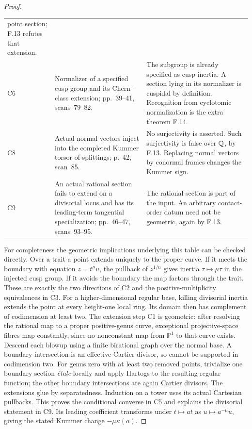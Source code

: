 \begin{proof}
\begin{longtable}{@{}>{\raggedright\arraybackslash}p{}>{\raggedright\arraybackslash}p{}>{\raggedright\arraybackslash}p{}@{}}
point section; F.13 refutes that extension.\\
C6 & Normalizer of a specified cusp group and its Chern-class
extension; pp.~39--41, scans~79--82.
& The subgroup is already specified as cusp inertia. A section
lying in its normalizer is cuspidal by definition. Recognition
from cyclotomic normalization is the extra theorem F.14.\\
C8 & Actual normal vectors inject into the completed Kummer
torsor of splittings; p.~42, scan~85.
& No surjectivity is asserted. Such surjectivity is false over
$\mathbb Q$, by F.13. Replacing normal vectors by conormal frames
changes the Kummer sign.\\
C9 & An actual rational section fails to extend on a divisorial
locus and has its leading-term tangential specialization;
pp.~46--47, scans~93--95.
& The rational section is part of the input. An arbitrary
contact-order datum need not be geometric, again by F.13.\\
\bottomrule
\end{longtable}

For completeness the geometric implications underlying this table
can be checked directly. Over a trait a point extends uniquely to
the proper curve. If it meets the boundary with equation
$z=t^\mu u$, the pullback of $z^{1/n}$ gives inertia
$\tau\mapsto\mu\tau$ in the injected cusp group. If it avoids
the boundary the map factors through the trait. These are exactly
the two directions of C2 and the positive-multiplicity equivalences
in C3. For a higher-dimensional regular base, killing divisorial
inertia extends the point at every height-one local ring. Its domain
then has complement of codimension at least two. The extension
step C1 is geometric: after resolving the rational map to a proper
positive-genus curve, exceptional projective-space fibres map
constantly, since no nonconstant map from $\mathbb P^1$ to that
curve exists. Descend each blowup using a finite birational graph
over the normal base. A boundary intersection is an effective
Cartier divisor, so cannot be supported in codimension two. For
genus zero with at least two removed points, trivialize one boundary
section \emph{\'etale}-locally and apply Hartogs to the resulting
regular function; the other boundary intersections are again
Cartier divisors. The extensions glue by separatedness. Induction
on a tower uses its actual Cartesian pullbacks. This proves the
conditional converse in C5 and explains the divisorial statement
in C9. Its leading coefficient transforms under $t\mapsto at$
as $u\mapsto a^{-\mu}u$, giving the stated Kummer change
$-\mu\kappa(a)$.


\end{proof}
